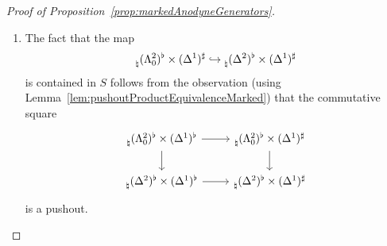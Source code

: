 \documentclass[reqno]{amsart}
\numberwithin{equation}{subsection}
\theoremstyle{plain}
\theoremstyle{definition}
\let\into=\hookrightarrow
\begin{document}
\begin{proof}[{Proof of Proposition~\ref{prop:markedAnodyneGenerators}}]
\begin{enumerate}[resume]
	Using that the maps in~(1) of Definition~\ref{def:markedAnodyne} are contained in $S$ as well as~\cite[Lemma~3.2.5]{Martini2021}, the map $\prescript{}{\natural}(I^3)^\flat \into \prescript{}{\natural}(\Delta^3)^\flat$ is in $S$. Hence the map in~(c) is in $S$ once we show that the inclusion  $\prescript{}{\natural}(I^3)^\flat \into \prescript{}{\natural}(\Lambda^3_0)^\flat$ is contained in $S$ too. Defining $K\subset \Lambda^3_0$ by means of the pushout
	\begin{equation*}
	\begin{tikzcd}
	I^2\arrow[r, hookrightarrow]\arrow[d, hookrightarrow, "d^{\{0,1,2\}}"] & \Delta^2\arrow[d]\\
	I^3\arrow[r, hookrightarrow] & K
	\end{tikzcd}
	\end{equation*}
	and $L\subset \Lambda^3_0$ as the pushout 
	\begin{equation*}
	\begin{tikzcd}
		I^2\arrow[r, hookrightarrow]\arrow[d, hookrightarrow, "d^{\{0,2,3\}}"] & \Delta^2\arrow[d]\\
		K\arrow[r, hookrightarrow] & L,
	\end{tikzcd}
	\end{equation*}
	the inclusion $\prescript{}{\natural}(I^3)^\flat\into \prescript{}{\natural}(L)^\flat$ is contained in $S$. Since the inclusion $L\into \Lambda^3_0$ is obtained as the pushout of $\Lambda^2_0\into\Delta^2$ along the inclusion $d^{\{0,1,3\}}\colon\Lambda^2_0\into L$, we conclude that the map $\prescript{}{\natural}(L)^\flat\into \prescript{}{\natural}(\Lambda^3_0)^\flat$ must be an element of $S$ as well. As a consequence, the map $\prescript{}{\natural}(\Lambda^3_0)^\flat\into \prescript{}{\natural}(\Delta^3)^\flat$ is in $S$ as claimed.
	\item The fact that the map 
	\begin{equation*}
		\prescript{}{\natural}(\Lambda^2_0)^\flat\times(\Delta^1)^\sharp\into \prescript{}{\natural}(\Delta^2)^\flat\times(\Delta^1)^\sharp
	\end{equation*} 
	is contained in $S$ follows from the observation (using Lemma~\ref{lem:pushoutProductEquivalenceMarked}) that the commutative square
	\begin{equation*}
	\begin{tikzcd}
		\prescript{}{\natural}(\Lambda^2_0)^\flat\times(\Delta^1)^\flat\arrow[d] \arrow[r]& \prescript{}{\natural}(\Lambda^2_0)^\flat\times(\Delta^1)^\sharp\arrow[d]\\  
		\prescript{}{\natural}(\Delta^2)^\flat\times(\Delta^1)^\flat \arrow[r]& \prescript{}{\natural}(\Delta^2)^\flat\times(\Delta^1)^\sharp
	\end{tikzcd}
	\end{equation*}
	is a pushout.
	

\end{enumerate}
\end{proof}
\end{document}
